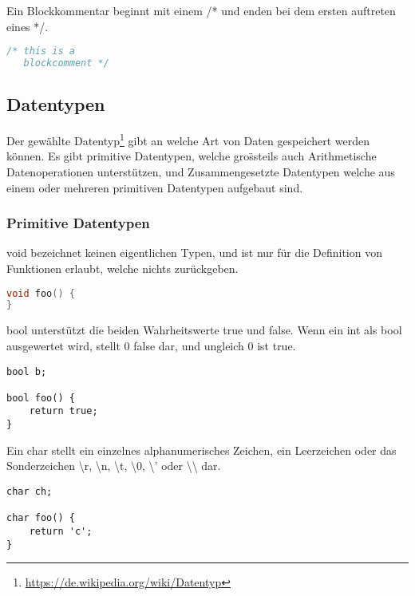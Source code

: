 Ein Blockkommentar beginnt mit einem /* und enden bei dem ersten auftreten eines */.

\begin{lstlisting}[language=C]
/* this is a
   blockcomment */
\end{lstlisting}

\subsection{Datentypen}

Der gew\"ahlte Datentyp\footnote{\url{https://de.wikipedia.org/wiki/Datentyp}} gibt an welche Art von Daten gespeichert werden k\"onnen. Es gibt primitive Datentypen, welche gro\"ss{}teils auch Arithmetische Datenoperationen unterst\"utzen, und Zusammengesetzte Datentypen welche aus einem oder mehreren primitiven Datentypen aufgebaut sind.

\subsubsection{Primitive Datentypen}


void bezeichnet keinen eigentlichen Typen, und ist nur f\"ur die Definition von Funktionen erlaubt, welche nichts zur\"uckgeben.

\begin{lstlisting}[language=C]
void foo() {
}
\end{lstlisting}


bool unterst\"utzt die beiden Wahrheitswerte true und false. Wenn ein int als bool ausgewertet wird, stellt 0 false dar, und ungleich 0 ist true.

\begin{lstlisting}[language=CMM]
bool b;

bool foo() {
	return true;
}
\end{lstlisting}


Ein char stellt ein einzelnes alphanumerisches Zeichen, ein Leerzeichen oder das Sonderzeichen \textbackslash{}r, \textbackslash{}n, \textbackslash{}t, \textbackslash{}0, \textbackslash{}' oder \textbackslash{}\textbackslash{} dar.

\begin{lstlisting}[language=CMM]
char ch;

char foo() {
	return 'c';
}
\end{lstlisting}

